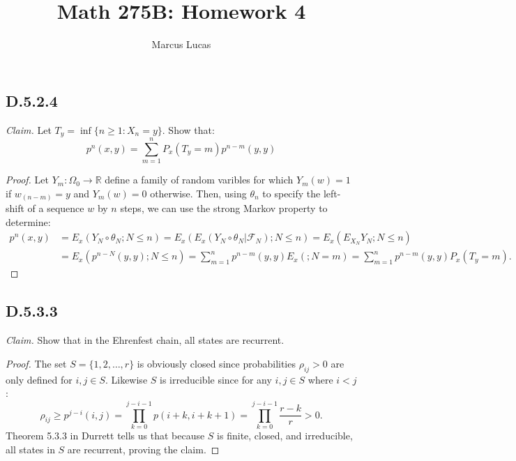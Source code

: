 \documentclass[10pt]{article}
\title{Math 275B: Homework 4}
\author{Marcus Lucas}
\date{\vspace{-1cm}}
\begin{document}
\maketitle

\subsection*{D.5.2.4}
\textit{Claim.} Let $T_y  = \inf\{n \ge 1: X_n = y\}$.
Show that:
\begin{equation*}
  p^n(x,y) = \sum_{m=1}^n P_x(T_y = m)p^{n-m}(y,y)
\end{equation*}

\begin{proof}
  Let $Y_m: \Omega_0 \to \mathbb{R}$
  define a family of random varibles for which $Y_m(w) = 1$ 
  if $w_{(n-m)} = y$ and $Y_m(w) = 0$ otherwise. Then,
  using $\theta_n$ to specify the left-shift of a sequence 
  $w$ by $n$ steps, we can use the strong Markov property
  to determine:
  \begin{equation*}
  \begin{aligned}
    p^n(x,y) & = E_x(Y_N \circ \theta_N; N \le n)
    = E_x(E_x(Y_N \circ \theta_N \vert \mathcal{F}_N); N \le n)
    = E_x(E_{X_N}Y_N; N \le n) \\ 
    & = E_x(p^{n-N}(y,y); N \le n) 
    = \sum_{m=1}^n p^{n-m}(y,y) E_x(; N = m)
    = \sum_{m=1}^n p^{n-m}(y,y) P_x(T_y = m).
  \end{aligned}
  \end{equation*}
\end{proof}

\subsection*{D.5.3.3}
\textit{Claim.} Show that in the Ehrenfest chain,
all states are recurrent.

\begin{proof}
  The set $S = \{1,2,\dots,r\}$ is obviously closed
  since probabilities $\rho_{ij} > 0$ are only defined
  for $i,j \in S$. Likewise $S$ is irreducible since for
  any $i,j \in S$ where $i<j$:
  \begin{equation*}
    \rho_{ij} \ge p^{j-i}(i,j) 
    = \prod_{k=0}^{j-i-1} p(i+k,i+k+1)
    = \prod_{k=0}^{j-i-1} \frac{r-k}{r} > 0.
  \end{equation*}
  Theorem 5.3.3 in Durrett tells us that because $S$ is
  finite, closed, and irreducible, all states in $S$ 
  are recurrent, proving the claim.
\end{proof}
\end{document}
